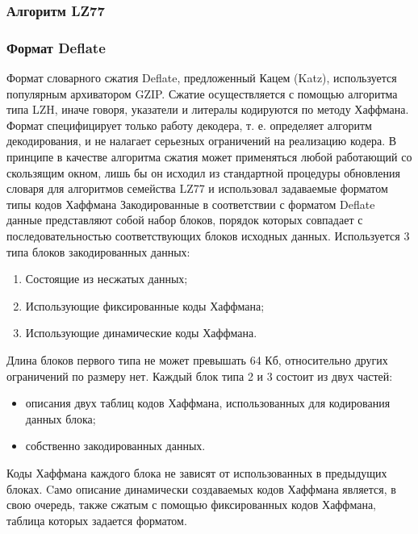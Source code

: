 \documentclass[12pt]{article}
\begin{document}
\subsubsection{Алгоритм LZ77}

\subsubsection{Формат Deflate}

Формат словарного сжатия Deflate, предложенный Кацем (Katz),
используется популярным архиватором GZIP.
Сжатие осуществляется с помощью алгоритма типа LZH, иначе говоря,
указатели и литералы кодируются по методу Хаффмана.
Формат специфицирует только работу декодера, т. е. определяет алгоритм декодирования,
и не налагает серьезных ограничений на реализацию кодера. В принципе в качестве алгоритма сжатия может применяться любой работающий со скользящим окном, лишь бы он исходил из стандартной процедуры обновления словаря для алгоритмов семейства LZ77 и использовал задаваемые форматом типы кодов Хаффмана
Закодированные в соответствии с форматом Deflate данные представляют собой набор блоков,
порядок которых совпадает с последовательностью соответствующих блоков исходных данных.
Используется 3 типа блоков закодированных данных:

\begin{enumerate}
    \item Состоящие из несжатых данных;
    \item Использующие фиксированные коды Хаффмана;
    \item Использующие динамические коды Хаффмана.
\end{enumerate}

Длина блоков первого типа не может превышать 64 Кб, относительно других ограничений по размеру нет. Каждый блок типа 2 и 3 состоит из двух частей:

\begin{itemize}[label=-]
    \item описания двух таблиц кодов Хаффмана, использованных для кодирования данных блока;
    \item собственно закодированных данных.
\end{itemize}

Коды Хаффмана каждого блока не зависят от использованных в предыдущих блоках.
Cамо описание динамически создаваемых кодов Хаффмана является, в свою очередь,
также сжатым с помощью фиксированных кодов Хаффмана, таблица которых задается форматом.
\end{document}

